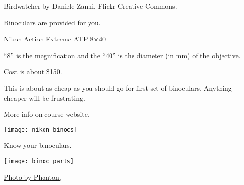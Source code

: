 \documentclass[t]{beamer}
\begin{document}
%
%
%
%
%
%
%

{
\begin{frame}[b,plain]
	\tiny Birdwatcher by Daniele Zanni, Flickr Creative Commons.
\end{frame}
}

{
\begin{frame}[t,plain]{Binoculars are provided for you.}


\begin{multicols}{2}
Nikon Action Extreme ATP 8$\times$40.

\smallskip

“8” is the magnification and the “40” is the diameter (in mm) of the objective.

\smallskip

Cost is about \$150.

\smallskip

This is about as cheap as you should go for first set of binoculars. Anything cheaper will be frustrating.

\smallskip

More info on course website.

\columnbreak

\texttt{[image: nikon\_binocs]}

\end{multicols}
%
%

\end{frame}
}

{
\begin{frame}[t,plain]{Know your binoculars.}

\texttt{[image: binoc\_parts]}

\end{frame}
}


{
\begin{frame}

\vfilll

\tinyfill \href{https://www.flickr.com/photos/36436392@N05/3373117530}{Photo by Phonton, }
\end{frame}
}
\end{document}
